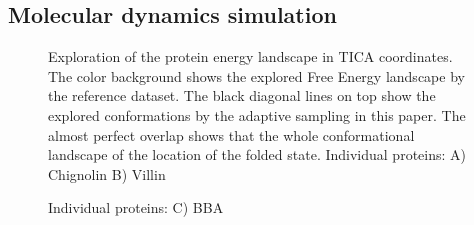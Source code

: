 \subsection{\label{sec:MD} Molecular dynamics simulation}

\begin{figure}[h!]
   \begin{subfigure}[b]{0.85\linewidth}
   {}
   \end{subfigure}%
   
   \begin{subfigure}[b]{0.85\linewidth}
   {}
   \end{subfigure}%

  \caption{Exploration of the protein energy landscape in TICA coordinates. The
 color background shows the explored Free Energy landscape by the reference
 dataset. The black diagonal lines on top show the explored conformations by the adaptive
 sampling in this paper. The almost perfect overlap shows that the whole
 conformational landscape of  the location of the folded state. Individual proteins: A) Chignolin B) Villin }
\end{figure}

\begin{figure}[h!]\ContinuedFloat

   
   \begin{subfigure}[b]{0.85\linewidth}
   {}
   \end{subfigure}%
  
   \begin{subfigure}[b]{0.85\linewidth}
   {}
   \end{subfigure}%

  \caption{ Individual proteins: C) BBA } 
  \label{fig:overlap}
\end{figure}


